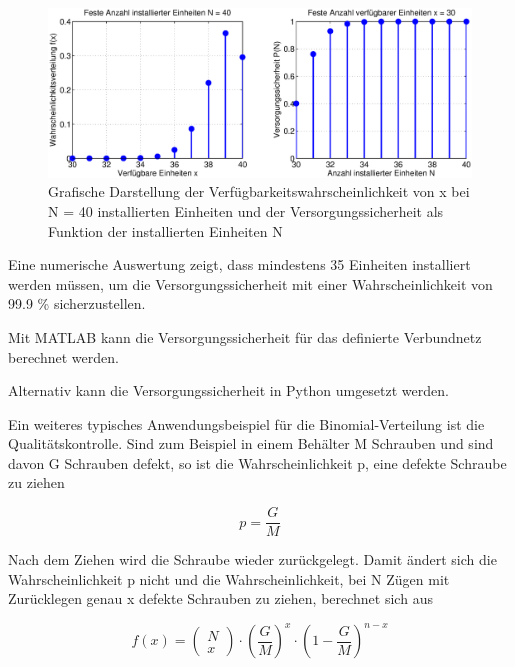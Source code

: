 \noindent 
\begin{figure}[H]
  \centerline{\includegraphics[width=1\textwidth]{Kapitel4/Bilder/image14}}
  \caption{Grafische Darstellung der Verf\"{u}gbarkeitswahrscheinlichkeit von x bei N = 40 installierten Einheiten und der Versorgungssicherheit als Funktion der installierten Einheiten N}
  \label{fig:Diskret_Binomial_Versorgungssicherheit}
\end{figure}

\noindent Eine numerische Auswertung zeigt, dass mindestens 35 Einheiten installiert werden m\"{u}ssen, um die Versorgungssicherheit mit einer Wahrscheinlichkeit von 99.9 \% sicherzustellen.\newline

\noindent Mit MATLAB kann die Versorgungssicherheit f\"{u}r das definierte Verbundnetz berechnet werden.



\clearpage

\noindent Alternativ kann die Versorgungssicherheit in Python umgesetzt werden.



\noindent Ein weiteres typisches Anwendungsbeispiel f\"{u}r die Binomial-Verteilung ist die Qualit\"{a}tskontrolle. Sind zum Beispiel in einem Beh\"{a}lter M Schrauben und sind davon G Schrauben defekt, so ist die Wahrscheinlichkeit p, eine defekte Schraube zu ziehen 

\begin{equation}\label{eq:fourhundredthirtysix}
p=\dfrac{G}{M} 
\end{equation}

\noindent Nach dem Ziehen wird die Schraube wieder zur\"{u}ckgelegt. Damit \"{a}ndert sich die Wahrscheinlichkeit p nicht und die Wahrscheinlichkeit, bei N Z\"{u}gen mit Zur\"{u}cklegen genau x defekte Schrauben zu ziehen, berechnet sich aus

\begin{equation}\label{eq:fourhundredthirtyseven}
f(x)=\left(\begin{array}{l} {N} \\ 
{x} \end{array}\right)\cdot \left(\dfrac{G}{M} \right)^{x} \cdot \left(1-\dfrac{G}{M} \right)^{n-x}
\end{equation}

